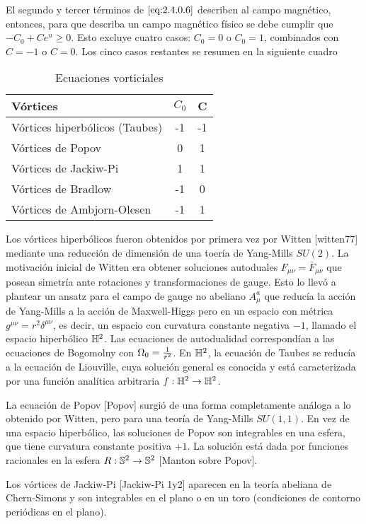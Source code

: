 El segundo y tercer términos de $\eqref{eq:2.4.0.6}$ describen al campo magnético, entonces, para que describa un campo magnético físico se debe cumplir que $-C_0+C e^{u}\geq 0$. Esto excluye cuatro casos: $C_0=0$ o $C_0=1$, combinados con $C=-1$ o $C=0$. Los cinco casos restantes se resumen en la siguiente cuadro
\begin{table}[ht]
    \centering
    \begin{tabular}{l|c|c}
        Vórtices & $C_0$ & C \\ \hline
        Vórtices hiperbólicos (Taubes) & -1 & -1\\
        Vórtices de Popov & 0 & 1\\
        Vórtices de Jackiw-Pi & 1 & 1\\
        Vórtices de Bradlow & -1 & 0\\
        Vórtices de Ambjorn-Olesen & -1 & 1\\ \hline
    \end{tabular}
    \caption{Ecuaciones vorticiales}
    \label{tab:vortex}
\end{table}

Los vórtices hiperbólicos fueron obtenidos por primera vez por Witten [witten77] mediante una reducción de dimensión de una toería de Yang-Mills $SU(2)$. La motivación inicial de Witten era obtener soluciones autoduales $F_{\mu\nu}=\bar F_{\mu\nu}$ que posean simetría ante rotaciones y transformaciones de gauge. Esto lo llevó a plantear un ansatz para el campo de gauge no abeliano $A_\mu^a$ que reducía la acción de Yang-Mills a la acción de Maxwell-Higgs pero en un espacio con métrica $g^{\mu\nu}=r^2\delta^{\mu\nu}$, es decir, un espacio con curvatura constante negativa $-1$, llamado el espacio hiperbólico $\mathbb{H}^2$. Las ecuaciones de autodualidad correspondían a las ecuaciones de Bogomolny con $\Omega_0=\frac{1}{r^2}$. En $\mathbb{H}^2$, la ecuación de Taubes se reducía a la ecuación de Liouville, cuya solución general es conocida y está caracterizada por una función analítica arbitraria $f:\mathbb{H}^2\rightarrow\mathbb{H}^2$.

La ecuación de Popov [Popov] surgió de una forma completamente análoga a lo obtenido por Witten, pero para una teoría de Yang-Mills $SU(1,1)$. En vez de una espacio hiperbólico, las soluciones de Popov son integrables en una esfera, que tiene curvatura constante positiva $+1$. La solución está dada por funciones racionales en la esfera $R:\mathbb{S}^2\rightarrow\mathbb{S}^2$ [Manton sobre Popov].

Los vórtices de Jackiw-Pi [Jackiw-Pi 1y2] aparecen en la teoría abeliana de Chern-Simons y son integrables en el plano o en un toro (condiciones de contorno periódicas en el plano).

